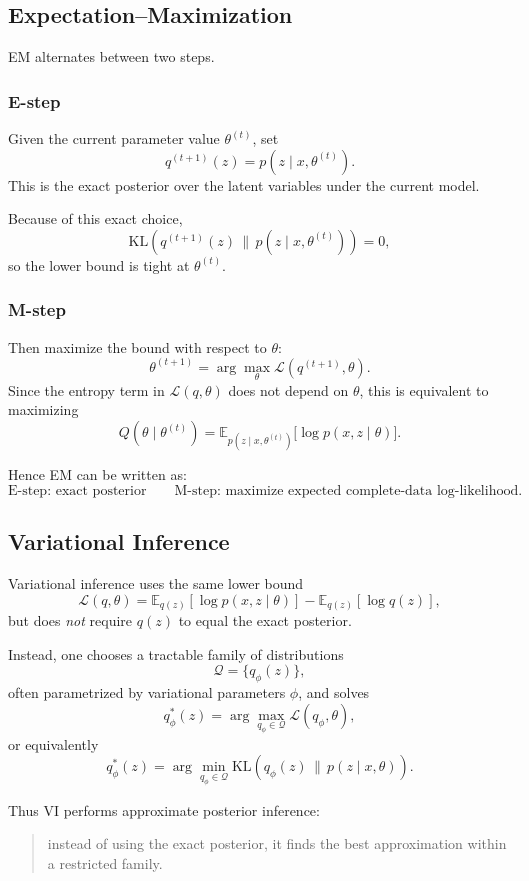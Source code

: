 \subsection{Expectation--Maximization}

EM alternates between two steps.

\subsubsection*{E-step}
Given the current parameter value \(\theta^{(t)}\), set
\[
q^{(t+1)}(z)=p(z\mid x,\theta^{(t)}).
\]
This is the exact posterior over the latent variables under the current model.

Because of this exact choice,
\[
\mathrm{KL}\!\left(q^{(t+1)}(z)\,\|\,p(z\mid x,\theta^{(t)})\right)=0,
\]
so the lower bound is tight at \(\theta^{(t)}\).

\subsubsection*{M-step}
Then maximize the bound with respect to \(\theta\):
\[
\theta^{(t+1)}
=
\arg\max_{\theta}\mathcal{L}(q^{(t+1)},\theta).
\]
Since the entropy term in \(\mathcal{L}(q,\theta)\) does not depend on \(\theta\), this is equivalent to maximizing
\[
Q(\theta\mid \theta^{(t)})
=
\mathbb{E}_{p(z\mid x,\theta^{(t)})}
\big[\log p(x,z\mid \theta)\big].
\]

Hence EM can be written as:
\[
\text{E-step: exact posterior} \qquad
\text{M-step: maximize expected complete-data log-likelihood.}
\]

\subsection{Variational Inference}

Variational inference uses the same lower bound
\[
\mathcal{L}(q,\theta)
=
\mathbb{E}_{q(z)}[\log p(x,z\mid \theta)]
-
\mathbb{E}_{q(z)}[\log q(z)],
\]
but does \emph{not} require \(q(z)\) to equal the exact posterior.

Instead, one chooses a tractable family of distributions
\[
\mathcal{Q}=\{q_\phi(z)\},
\]
often parametrized by variational parameters \(\phi\), and solves
\[
q_\phi^*(z)
=
\arg\max_{q_\phi\in \mathcal Q}\mathcal{L}(q_\phi,\theta),
\]
or equivalently
\[
q_\phi^*(z)
=
\arg\min_{q_\phi\in \mathcal Q}
\mathrm{KL}\!\left(q_\phi(z)\,\|\,p(z\mid x,\theta)\right).
\]

Thus VI performs approximate posterior inference:
\begin{quote}
instead of using the exact posterior, it finds the best approximation within a restricted family.
\end{quote}

